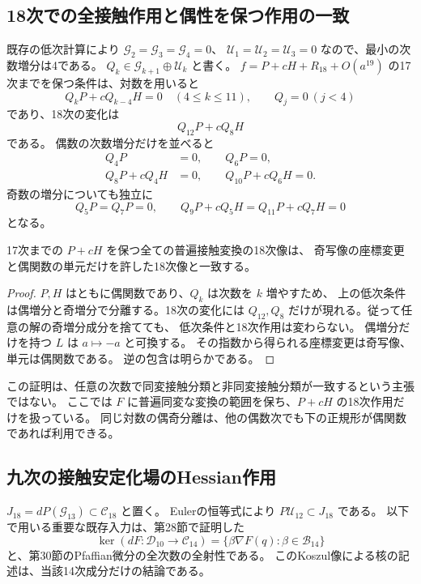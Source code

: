 \subsection{18次での全接触作用と偶性を保つ作用の一致}

既存の低次計算により $\mathcal G_2=\mathcal G_3=\mathcal G_4=0$、
$\mathcal U_1=\mathcal U_2=\mathcal U_3=0$ なので、最小の次数増分は4である。
$Q_k\in\mathcal G_{k+1}\oplus\mathcal U_k$ と書く。
$f=P+cH+R_{18}+O(a^{19})$ の17次までを保つ条件は、対数を用いると
\[
 Q_kP+cQ_{k-4}H=0\quad(4\le k\le11),
 \qquad Q_j=0\ (j<4)
\]
であり、18次の変化は
\[
 Q_{12}P+cQ_8H
\]
である。
偶数の次数増分だけを並べると
\begin{equation}\label{eq:v14-even-stabilizer-chain}
 \begin{split}
 Q_4P&=0,\qquad Q_6P=0,\\
 Q_8P+cQ_4H&=0,\qquad Q_{10}P+cQ_6H=0.
 \end{split}
\end{equation}
奇数の増分についても独立に
\[
 Q_5P=Q_7P=0,\qquad
 Q_9P+cQ_5H=Q_{11}P+cQ_7H=0
\]
となる。

\begin{proposition}[18次では偶性保存への制限で有効像が変わらない]
\label{prop:v14-parity-restriction}
17次までの $P+cH$ を保つ全ての普遍接触変換の18次像は、
奇写像の座標変更と偶関数の単元だけを許した18次像と一致する。
\end{proposition}

\begin{proof}
$P,H$ はともに偶関数であり、$Q_k$ は次数を $k$ 増やすため、
上の低次条件は偶増分と奇増分で分離する。18次の変化には
$Q_{12},Q_8$ だけが現れる。従って任意の解の奇増分成分を捨てても、
低次条件と18次作用は変わらない。
偶増分だけを持つ $L$ は $a\mapsto-a$ と可換する。
その指数から得られる座標変更は奇写像、単元は偶関数である。
逆の包含は明らかである。
\end{proof}

この証明は、任意の次数で同変接触分類と非同変接触分類が一致するという主張ではない。
ここでは $F$ に普遍同変な変換の範囲を保ち、$P+cH$ の18次作用だけを扱っている。
同じ対数の偶奇分離は、他の偶数次でも下の正規形が偶関数であれば利用できる。

\subsection{九次の接触安定化場のHessian作用}

$J_{18}=dP(\mathcal G_{13})\subset\mathcal C_{18}$ と置く。
Eulerの恒等式により $P\mathcal U_{12}\subset J_{18}$ である。
以下で用いる重要な既存入力は、第28節で証明した
\[
 \ker(dF:\mathcal D_{10}\to\mathcal C_{14})
       =\{\beta\nabla F(q):\beta\in\mathcal B_{14}\}
\]
と、第30節のPfaffian微分の全次数の全射性である。
このKoszul像による核の記述は、当該14次成分だけの結論である。

